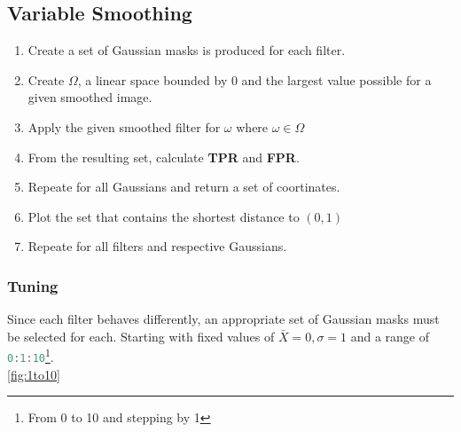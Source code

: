 \documentclass{Resources/UoBLab1}
\begin{document}
\subsection{Variable Smoothing}
\begin{enumerate}
	\item Create a set of Gaussian masks is produced for each filter.
	\item Create $\Omega$, a linear space bounded by 0 and the largest value possible for a given smoothed image.
	\item Apply the given smoothed filter for $\omega$ where $\omega \in \Omega$
	\item From the resulting set, calculate \textbf{TPR} and \textbf{FPR}.
	\item Repeate for all Gaussians and return a set of coortinates.
	\item Plot the set that contains the shortest distance to \((0,1)\)
	\item Repeate for all filters and respective Gaussians.
\end{enumerate}
\subsubsection*{Tuning}
Since each filter behaves differently, an appropriate set of Gaussian masks must be selected for each.
Starting with fixed values of \begin{math}
\bar{X} = 0 ,  \sigma{} = 1
\end{math}
and a range of
\lstinline[language=MATLAB]{0:1:10}\footnote[2]{From 0 to 10 and stepping by 1}.\\\autoref{fig:1to10}
\end{document}
